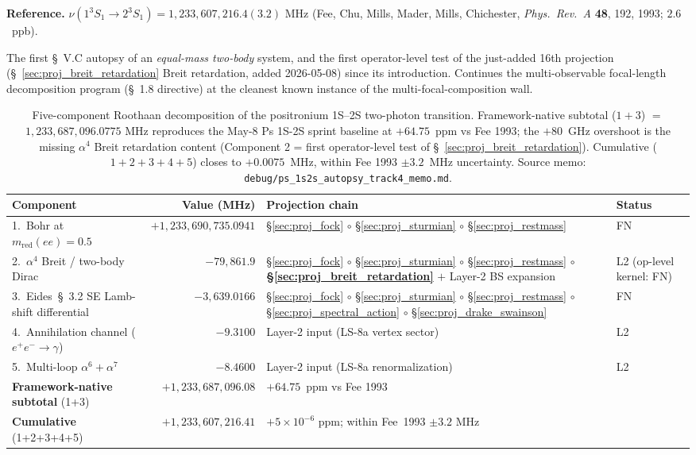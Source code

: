 \documentclass[11pt]{article}
\begin{document}
\textbf{Reference.}  $\nu(1^3 S_1 \to 2^3 S_1) = 1{,}233{,}607{,}216.4(3.2)$
MHz (Fee, Chu, Mills, Mader, Mills, Chichester, \emph{Phys.\ Rev.\ A}
\textbf{48}, 192, 1993; $2.6$~ppb).

The first \S~V.C autopsy of an \emph{equal-mass two-body} system, and the
first operator-level test of the just-added 16th projection
(\S~\ref{sec:proj_breit_retardation} Breit retardation, added 2026-05-08)
since its introduction.  Continues the multi-observable focal-length
decomposition program (\S~1.8 directive) at the cleanest known instance of
the multi-focal-composition wall.

\begin{table}[h!]
\centering\small
\caption{Five-component Roothaan decomposition of the positronium 1S--2S
two-photon transition.  Framework-native subtotal ($1 + 3$) $=$
$1{,}233{,}687{,}096.0775$ MHz reproduces the May-8 Ps 1S-2S sprint
baseline at $+64.75$~ppm vs Fee 1993; the $+80$~GHz overshoot is the
missing $\alpha^4$ Breit retardation content (Component 2 = first
operator-level test of \S~\ref{sec:proj_breit_retardation}).
Cumulative ($1+2+3+4+5$) closes to $+0.0075$~MHz, within Fee 1993
$\pm 3.2$~MHz uncertainty.  Source memo:
\texttt{debug/ps\_1s2s\_autopsy\_track4\_memo.md}.}
\label{tab:autopsy_ps_1s2s}
\begin{tabular}{p{4.6cm} r p{4.5cm} l}
\toprule
Component & Value (MHz) & Projection chain & Status \\
\midrule
1.~Bohr at $m_\text{red}(ee) = 0.5$ & $+1{,}233{,}690{,}735.0941$ &
\S\ref{sec:proj_fock} $\circ$ \S\ref{sec:proj_sturmian} $\circ$
\S\ref{sec:proj_restmass} & FN \\
2.~$\alpha^4$ Breit / two-body Dirac & $-79{,}861.9$ &
\S\ref{sec:proj_fock} $\circ$ \S\ref{sec:proj_sturmian} $\circ$
\S\ref{sec:proj_restmass} $\circ$
\textbf{\S\ref{sec:proj_breit_retardation}} $+$ Layer-2 BS expansion
& L2 (op-level kernel: FN) \\
3.~Eides~\S~3.2 SE Lamb-shift differential & $-3{,}639.0166$ &
\S\ref{sec:proj_fock} $\circ$ \S\ref{sec:proj_sturmian} $\circ$
\S\ref{sec:proj_restmass} $\circ$ \S\ref{sec:proj_spectral_action}
$\circ$ \S\ref{sec:proj_drake_swainson} & FN \\
4.~Annihilation channel ($e^+e^- \to \gamma$) & $-9.3100$ &
Layer-2 input (LS-8a vertex sector) & L2 \\
5.~Multi-loop $\alpha^6 + \alpha^7$ & $-8.4600$ &
Layer-2 input (LS-8a renormalization) & L2 \\
\midrule
\textbf{Framework-native subtotal} (1+3) & $+1{,}233{,}687{,}096.08$ &
\multicolumn{2}{l}{$+64.75$~ppm vs Fee 1993} \\
\textbf{Cumulative} (1+2+3+4+5) & $+1{,}233{,}607{,}216.41$ &
\multicolumn{2}{l}{$+5\times 10^{-6}$ ppm; within Fee~1993 $\pm 3.2$ MHz} \\
\bottomrule
\end{tabular}
\end{table}
\end{document}
